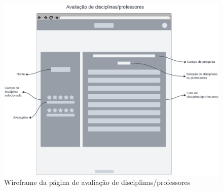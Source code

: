 \begin{figure}[ht]
    \begin{center}
    \includegraphics[width=390pt]{figuras/pagina-avaliacao.png}
    \caption{Wireframe da página de avaliação de disciplinas/professores}
    \label{fig:wireframe-pagina-avaliacao}
    \end{center}
\end{figure}